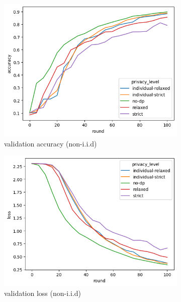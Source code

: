 \begin{figure}
	\centering
	\begin{subfigure}{0.4\textwidth}
		\centering
		\includegraphics[width=\textwidth]{Bilder/emnist-accuracy.png}
		\caption{validation accuracy (non-i.i.d)}
	\end{subfigure}
	\begin{subfigure}{0.4\textwidth}
		\centering
		\includegraphics[width=\textwidth]{Bilder/emnist-loss.png}
		\caption{validation loss (non-i.i.d)}
	\end{subfigure}
	\begin{subfigure}{0.4\textwidth}
		\centering

\end{subfigure}
\end{figure}
